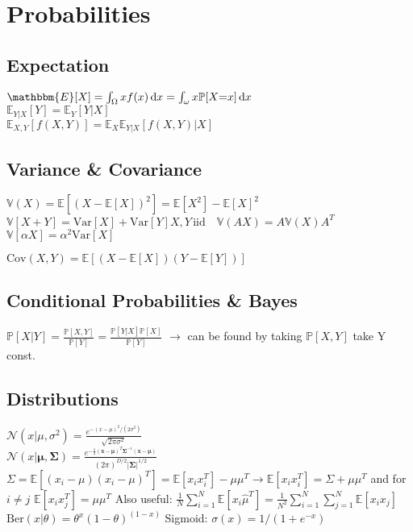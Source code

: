 \section*{Probabilities}
\subsection*{Expectation}
$\mathbbm{E}[X]=\int_{\Omega}xf(x)\di x=\int_{\omega}x\mathbb{P}[X{=}x]\di x$ \\
$\mathbb{E}_{Y|X}[Y]=\mathbb{E}_{Y}[Y|X]$\\
$\mathbb{E}_{X,Y}[f(X,Y)]=\mathbb{E}_{X}\mathbb{E}_{Y|X}[f(X,Y)|X]$

\subsection*{Variance \& Covariance}
$\mathbb{V}(X){=}\mathbb{E}[(X{-}\mathbb{E}[X])^2]{=}\mathbb{E}[X^2]{-}\mathbb{E}[X]^2$\\
$\mathbb{V}[X+Y]{=}\mathrm{Var}[X]+\mathrm{Var}[Y] X,Y \,\text{iid} \quad
\mathbb{V}(AX) = A \mathbb{V}(X) A^T$ 
$\mathbb{V}[\alpha X]=\alpha^2\mathrm{Var}[X]$

$\mathrm{Cov}(X,Y)=\mathbb{E}[(X-\mathbb{E}[X])(Y-\mathbb{E}[Y])]$

\subsection*{Conditional Probabilities \& Bayes}
$\mathbb{P}[X|Y]=\frac{\mathbb{P}[X,Y]}{\mathbb{P}[Y]}=\frac{\mathbb{P}[Y|X]\mathbb{P}[X]}{\mathbb{P}[Y]}$
$\rightarrow$ can be found by taking $\mathbb{P}[X,Y]$ take Y const.

\subsection*{Distributions}
$\mathcal{N}(x|\mu, \sigma^2)=\frac{e^{-(x-\mu)^2/(2\sigma^2)}}{\sqrt{2\pi\sigma^2}}$\\
$\mathcal{N}(x|\bm{\mu}, \bm{\Sigma})= \frac{e^{-\frac{1}{2}(\mathbf{x}-\bm{\mu})^T\bm{\Sigma}^{-1}(\mathbf{x}-\bm{\mu})}}{(2\pi)^{D/2}|\bm{\Sigma}|^{1/2}} $\\
$\Sigma = \mathbb{E}[(x_i-\mu)(x_i-\mu)^T] = \mathbb{E}[x_ix_i^T]-\mu\mu^T \rightarrow \mathbb{E}[x_ix_i^T] = \Sigma + \mu \mu^T$ and for $i\neq j$ $\mathbb{E}[x_ix_j^T] = \mu\mu^T$
Also useful: $\frac{1}{N} \sum_{i=1}^N \mathbb{E}[x_i\hat\mu^T] = \frac{1}{N^2} \sum_{i=1}^N \sum_{j=1}^N \mathbb{E}[x_ix_j] $ $\mathrm{Ber}(x|\theta){=}\theta^x (1{-}\theta)^{(1-x)}$
Sigmoid: $\sigma(x)=1/(1+e^{-x})$
